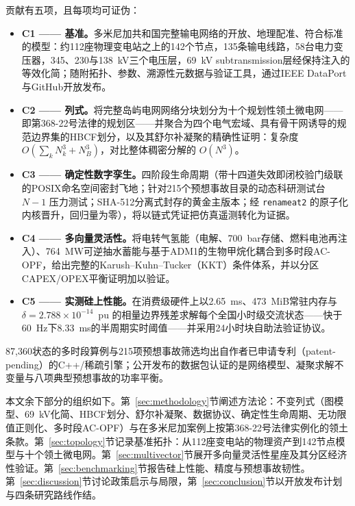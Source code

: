 贡献有五项，且每项均可证伪：
\begin{itemize}
\item \textbf{C1 —— 基准。}多米尼加共和国完整输电网络的开放、地理配准、符合标准的模型：约112座物理变电站之上的142个节点，135条输电线路，58台电力变压器，345、230与138~kV三个电压层，69~kV subtransmission层经保持注入的等效化简；随附拓扑、参数、溯源性元数据与验证工具，通过IEEE DataPort与GitHub开放发布。
\item \textbf{C2 —— 列式。}将完整岛屿电网网络分块划分为十个规划性领土微电网——即第368-22号法律的规划区——并聚合为四个电气宏域、具有骨干网诱导的规范边界集的HBCF划分，以及其舒尔补凝聚的精确性证明：复杂度 $O(\sum_k N_k^3 + N_B^3)$，对比整体稠密分解的 $O(N^3)$。
\item \textbf{C3 —— 确定性数字孪生。}四阶段生命周期（带十四道失效即闭校验门级联的POSIX命名空间密封飞地；针对215个预想事故目录的动态科研测试台 $N-1$ 压力测试；SHA-512分离式封存的黄金主版本；经 \texttt{renameat2} 的原子化内核晋升，回归量为零），将以链式凭证把仿真遥测转化为证据。
\item \textbf{C4 —— 多向量灵活性。}将电转气氢能（电解、700~bar存储、燃料电池再注入）、764~MW可逆抽水蓄能与基于ADM1的生物甲烷化耦合到多时段AC-OPF，给出完整的Karush--Kuhn--Tucker（KKT）条件体系，并以分区CAPEX/OPEX平衡证明加以验证。
\item \textbf{C5 —— 实测硅上性能。}在消费级硬件上以2.65~ms、473~MiB常驻内存与 $\delta = 2.788 \times 10^{-14}$~pu 的相量边界残差求解每个全国小时级交流状态——快于60~Hz下8.33~ms的半周期实时阈值——并采用24小时块自助法验证协议。
\end{itemize}

87,360状态的多时段算例与215项预想事故筛选均出自作者已申请专利（patent-pending）的C++/稀疏引擎；公开发布的数据包认证的是网络模型、凝聚求解不变量与八项典型预想事故的功率平衡。

本文余下部分的组织如下。第~\ref{sec:methodology}节阐述方法论：不变列式（图模型、69~kV化简、HBCF划分、舒尔补凝聚、数据协议、确定性生命周期、无功限值正则化、多时段AC-OPF）与在多米尼加案例上按第368-22号法律实例化的领土条款。第~\ref{sec:topology}节记录基准拓扑：从112座变电站的物理资产到142节点模型与十个领土微电网。第~\ref{sec:multivector}节展开多向量灵活性星座及其分区经济性验证。第~\ref{sec:benchmarking}节报告硅上性能、精度与预想事故韧性。第~\ref{sec:discussion}节讨论政策启示与局限，第~\ref{sec:conclusion}节以开放发布计划与四条研究路线作结。
